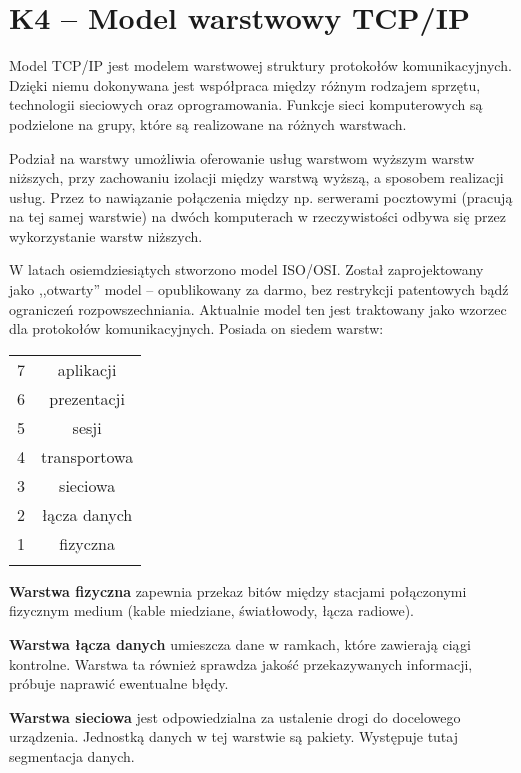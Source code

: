 \sloppy\section{K4 -- Model warstwowy TCP/IP}
Model TCP/IP jest modelem warstwowej struktury protokołów komunikacyjnych. Dzięki niemu dokonywana jest współpraca między różnym rodzajem sprzętu, technologii sieciowych oraz oprogramowania. Funkcje sieci komputerowych są podzielone na grupy, które są realizowane na różnych warstwach.

Podział na warstwy umożliwia oferowanie usług warstwom wyższym warstw niższych, przy zachowaniu izolacji między warstwą wyższą, a sposobem realizacji usług. Przez to nawiązanie połączenia między np. serwerami pocztowymi (pracują na tej samej warstwie) na dwóch komputerach w rzeczywistości odbywa się przez wykorzystanie warstw niższych.

W latach osiemdziesiątych stworzono model ISO/OSI. Został zaprojektowany jako ,,otwarty'' model -- opublikowany za darmo, bez restrykcji patentowych bądź ograniczeń rozpowszechniania. Aktualnie model ten jest traktowany jako wzorzec dla protokołów komunikacyjnych. Posiada on siedem warstw:
\begin{table}[H]
\centering
\begin{tabular}{c|c|} \hhline{~-}
7 & \cellcolor{blue!20}aplikacji    \\ \hhline{~-}
6 & \cellcolor{blue!20}prezentacji  \\ \hhline{~-}
5 & \cellcolor{blue!20}sesji        \\ \hhline{~-}
4 & \cellcolor{red!20}transportowa \\ \hhline{~-}
3 & \cellcolor{green!20}sieciowa     \\ \hhline{~-}
2 & \cellcolor{yellow!20}łącza danych \\ \hhline{~-}
1 & \cellcolor{yellow!20}fizyczna     \\ \hhline{~-}
\end{tabular}
\end{table}

\textbf{Warstwa fizyczna} zapewnia przekaz bitów między stacjami połączonymi fizycznym medium (kable miedziane, światłowody, łącza radiowe).

\textbf{Warstwa łącza danych} umieszcza dane w ramkach, które zawierają ciągi kontrolne. Warstwa ta również sprawdza jakość przekazywanych informacji, próbuje naprawić ewentualne błędy.

\textbf{Warstwa sieciowa} jest odpowiedzialna za ustalenie drogi do docelowego urządzenia. Jednostką danych w tej warstwie są pakiety. Występuje tutaj segmentacja danych.

